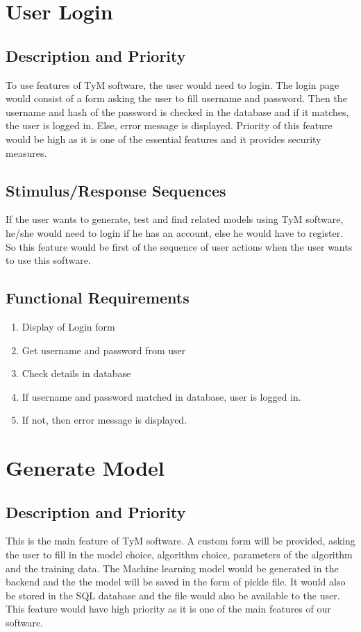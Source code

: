 \documentclass{scrreprt}
\begin{document}
\section{User Login}

\subsection{Description and Priority}
To use features of TyM software, the user would need to login. The login page would consist of a form asking the user to fill username and password. Then the username and hash of the password is checked in the database and if it matches, the user is logged in. Else, error message is displayed. Priority of this feature would be high as it is one of the essential features and it provides security measures.

\subsection{Stimulus/Response Sequences}
If the user wants to generate, test and find related models using TyM software, he/she would need to login if he has an account, else he would have to register. So this feature would be first of the sequence of user actions when the user wants to use this software.  

\subsection{Functional Requirements}
\begin{enumerate}
\item Display of Login form
\item Get username and password from user
\item Check details in database
\item If username and password matched in database, user is logged in.
\item If not, then error message is displayed.
\end{enumerate}

\section{Generate Model}

\subsection{Description and Priority}
This is the main feature of TyM software. A custom form will be provided, asking the user to fill in the model choice, algorithm choice, parameters of the algorithm and the training data. The Machine learning model would be generated in the backend and the the model will be saved in the form of pickle file. It would also be stored in the SQL database and the file would also be available to the user. This feature would have high priority as it is one of the main features of our software.
\end{document}
